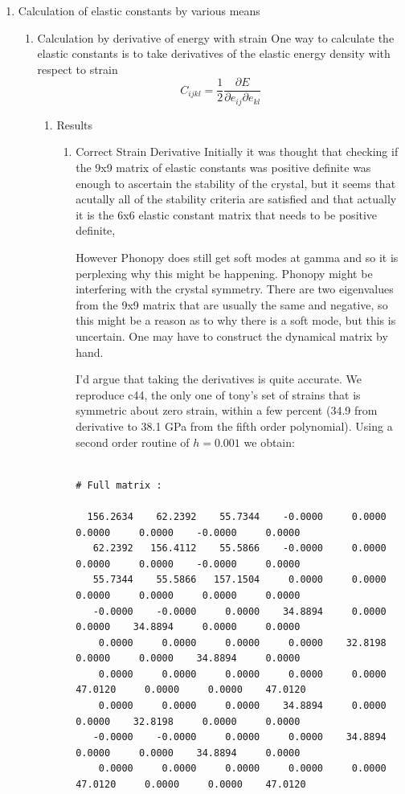 \documentclass[11pt]{article}
\begin{document}
\begin{enumerate}
\item Calculation of elastic constants by various means
\label{sec:org545450a}
\begin{enumerate}
\item Calculation by derivative of energy with strain
\label{sec:org7aeebcc}
One way to calculate the elastic constants is to take derivatives of the elastic energy density with respect to strain
\[ C_{ijkl} = \frac{1}{2}\frac{\partial E}{ \partial e_{ij} \partial
e_{kl} } \]
\begin{enumerate}
\item Results
\label{sec:org81c0fd4}
\begin{enumerate}
\item Correct Strain Derivative
\label{sec:org6c950b2}
Initially it was thought that checking if the 9x9 matrix of elastic constants was positive definite was enough
to ascertain the stability of the crystal, but it seems that acutally all of the stability criteria
are satisfied and that actually it is the 6x6 elastic constant matrix that needs to be positive definite,

However Phonopy does still get soft modes at gamma and so it is perplexing why this might be happening. 
Phonopy might be interfering with the crystal symmetry.
There are two eigenvalues from the 9x9 matrix that are usually the same and negative, so this might be a reason
as to why there is a soft mode, but this is uncertain. One may have to construct the dynamical matrix by hand. 

I'd argue that taking the derivatives is quite accurate. We reproduce c44, the only one of tony's set of strains
that is symmetric about zero strain, within a few percent (34.9 from derivative to 38.1 GPa from the fifth order polynomial).
Using a second order routine of \(h=0.001\) we obtain:
\begin{verbatim}

# Full matrix :

  156.2634    62.2392    55.7344    -0.0000     0.0000     0.0000     0.0000    -0.0000     0.0000
   62.2392   156.4112    55.5866    -0.0000     0.0000     0.0000     0.0000    -0.0000     0.0000
   55.7344    55.5866   157.1504     0.0000     0.0000     0.0000     0.0000     0.0000     0.0000
   -0.0000    -0.0000     0.0000    34.8894     0.0000     0.0000    34.8894     0.0000     0.0000
    0.0000     0.0000     0.0000     0.0000    32.8198     0.0000     0.0000    34.8894     0.0000
    0.0000     0.0000     0.0000     0.0000     0.0000    47.0120     0.0000     0.0000    47.0120
    0.0000     0.0000     0.0000    34.8894     0.0000     0.0000    32.8198     0.0000     0.0000
   -0.0000    -0.0000     0.0000     0.0000    34.8894     0.0000     0.0000    34.8894     0.0000
    0.0000     0.0000     0.0000     0.0000     0.0000    47.0120     0.0000     0.0000    47.0120


\end{verbatim}
\end{enumerate}
\end{enumerate}
\end{enumerate}
\end{enumerate}
\end{document}
